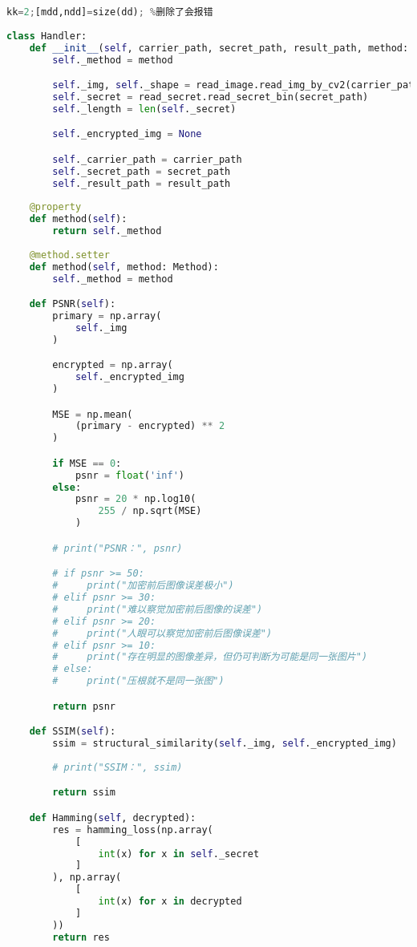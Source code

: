 \documentclass[a4paper,zihao=5,UTF8]{ctexart}
\begin{document}
\begin{lstlisting}[language=Python]%设置不同语言即可。
kk=2;[mdd,ndd]=size(dd); %删除了会报错
    
class Handler:
    def __init__(self, carrier_path, secret_path, result_path, method: Method=None) -> None:
        self._method = method

        self._img, self._shape = read_image.read_img_by_cv2(carrier_path)
        self._secret = read_secret.read_secret_bin(secret_path)
        self._length = len(self._secret)

        self._encrypted_img = None

        self._carrier_path = carrier_path
        self._secret_path = secret_path
        self._result_path = result_path
    
    @property
    def method(self):
        return self._method
    
    @method.setter
    def method(self, method: Method):
        self._method = method

    def PSNR(self):
        primary = np.array(
            self._img
        )

        encrypted = np.array(
            self._encrypted_img
        )

        MSE = np.mean(
            (primary - encrypted) ** 2
        )

        if MSE == 0:
            psnr = float('inf')
        else:
            psnr = 20 * np.log10(
                255 / np.sqrt(MSE)
            )

        # print("PSNR：", psnr)

        # if psnr >= 50:
        #     print("加密前后图像误差极小")
        # elif psnr >= 30:
        #     print("难以察觉加密前后图像的误差")
        # elif psnr >= 20:
        #     print("人眼可以察觉加密前后图像误差")
        # elif psnr >= 10:
        #     print("存在明显的图像差异，但仍可判断为可能是同一张图片")
        # else:
        #     print("压根就不是同一张图")

        return psnr

    def SSIM(self):
        ssim = structural_similarity(self._img, self._encrypted_img)
        
        # print("SSIM：", ssim)

        return ssim

    def Hamming(self, decrypted):
        res = hamming_loss(np.array(
            [
                int(x) for x in self._secret
            ]
        ), np.array(
            [
                int(x) for x in decrypted
            ]
        ))
        return res


\end{lstlisting}
\end{document}
